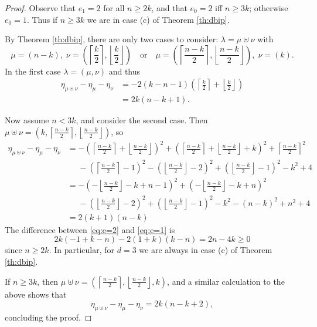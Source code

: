 \documentclass[12pt,dvipsnames,accepted=2016-08-18,a4paper,onecolumn]{quantumarticle}
\def\la{\lambda}
\def\la{\lambda}
\numberwithin{equation}{section}
\theoremstyle{definition}
\begin{document}
\begin{proof}
Observe that $e_1=2$ for all $n\geq2k$, and that
$e_0=2$ iff $n\geq3k$; otherwise $e_0=1$.
Thus if $n\geq3k$ we are in case (c) of Theorem \ref{th:dbip}.

By Theorem \ref{th:dbip}, there are only two cases to consider:
$\la=\mu\uplus\nu$ with
\[
    \mu=(n-k), \; \nu=\left(\left\lceil \frac k2\right\rceil, \left\lfloor \frac k2\right\rfloor  \right) 
    \quad \text{or} \quad
    \mu=\left(\left\lceil \frac {n-k}2\right\rceil, \left\lfloor \frac {n-k}2\right\rfloor  \right),  \; \nu=(k).
\]
In the first case $\lambda=(\mu,\nu)$ and thus
\begin{equation}\label{eq:e=1}
\begin{split}
    \eta_{\mu\uplus\nu}-\eta_\mu-\eta_\nu & = -2 (k-n-1) \left(\left\lceil \frac{k}{2}\right\rceil +\left\lfloor
   \frac{k}{2}\right\rfloor \right) \\
   & = 2 k (n-k+1).
\end{split}
\end{equation}

Now assume $n<3k$, and consider the second case. Then 
$\mu\uplus\nu=\left(k, \left\lceil \frac {n-k}2\right\rceil, \left\lfloor \frac {n-k}2\right\rfloor  \right)$,
so
\begin{equation}\label{eq:e=2}
\begin{split}
    \eta_{\mu\uplus\nu}-\eta_\mu-\eta_\nu & =-\left(\left\lceil \frac{n-k}{2}\right\rceil +\left\lfloor
   \frac{n-k}{2}\right\rfloor \right)^2+\left(\left\lceil
   \frac{n-k}{2}\right\rceil +\left\lfloor
   \frac{n-k}{2}\right\rfloor +k\right)^2 
    +\left\lceil \frac{n-k}{2}\right\rceil ^2
\\
   & \phantom{{}={}}
   -\left(\left\lceil \frac{n-k}{2}\right\rceil -1\right)^2
   -\left(\left\lfloor
   \frac{n-k}{2}\right\rfloor -2\right)^2+\left(\left\lfloor
   \frac{n-k}{2}\right\rfloor -1\right)^2-k^2+4 \\
   & = -\left(-\left\lfloor \frac{n-k}{2}\right\rfloor
   -k+n-1\right)^2+\left(-\left\lfloor \frac{n-k}{2}\right\rfloor
   -k+n\right)^2
   \\
   & \phantom{{}={}}
   -\left(\left\lfloor \frac{n-k}{2}\right\rfloor-2\right)^2+\left(\left\lfloor \frac{n-k}{2}\right\rfloor
   -1\right)^2-k^2-(n-k)^2+n^2+4 
   \\
   & = 2 ( k+1) (n-k)
\end{split}
\end{equation}
The difference between \eqref{eq:e=2} and \eqref{eq:e=1} is
\[
    2 k (-1 + k - n) - 2 (1 + k) (k - n) = 2 n - 4k \geq 0
\]
since $n\geq2k$. In particular, for $d=3$ we are always in case (c) of Theorem \ref{th:dbip}.

If $n\geq3k$, then 
$\mu\uplus\nu=\left( \left\lceil \frac {n-k}2\right\rceil, \left\lfloor \frac {n-k}2\right\rfloor ,k \right)$, and
a similar calculation to the above shows that 
\begin{equation}\label{eq:e=2again}
    \eta_{\mu\uplus\nu}-\eta_\mu-\eta_\nu  =
   2 k ( n - k + 2),
\end{equation}
concluding the proof.
\end{proof}
\end{document}
